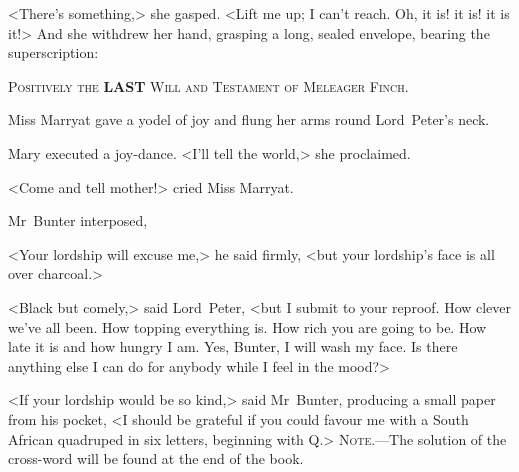<There's something,> she gasped. <Lift me up; I can't reach. Oh, it is! it is! it is it!> And she withdrew her hand, grasping a long, sealed envelope, bearing the superscription:

\begin{center}\scshape\large
Positively the \textbf{LAST} Will and Testament of Meleager Finch.
\end{center}

Miss Marryat gave a yodel of joy and flung her arms round Lord~Peter's neck.

Mary executed a joy-dance. <I'll tell the world,> she proclaimed.

<Come and tell mother!> cried Miss Marryat.

Mr~Bunter interposed,

<Your lordship will excuse me,> he said firmly, <but your lordship's face is all over charcoal.>

<Black but comely,> said Lord~Peter, <but I submit to your reproof. How clever we've all been. How topping everything is. How rich you are going to be. How late it is and how hungry I am. Yes, Bunter, I will wash my face. Is there anything else I can do for anybody while I feel in the mood?>

<If your lordship would be so kind,> said Mr~Bunter, producing a small paper from his pocket, <I should be grateful if you could favour me with a South African quadruped in six letters, beginning with Q\@.>
\vfill
\textsc{Note}.—The solution of the cross-word will be found at the end of the book.
